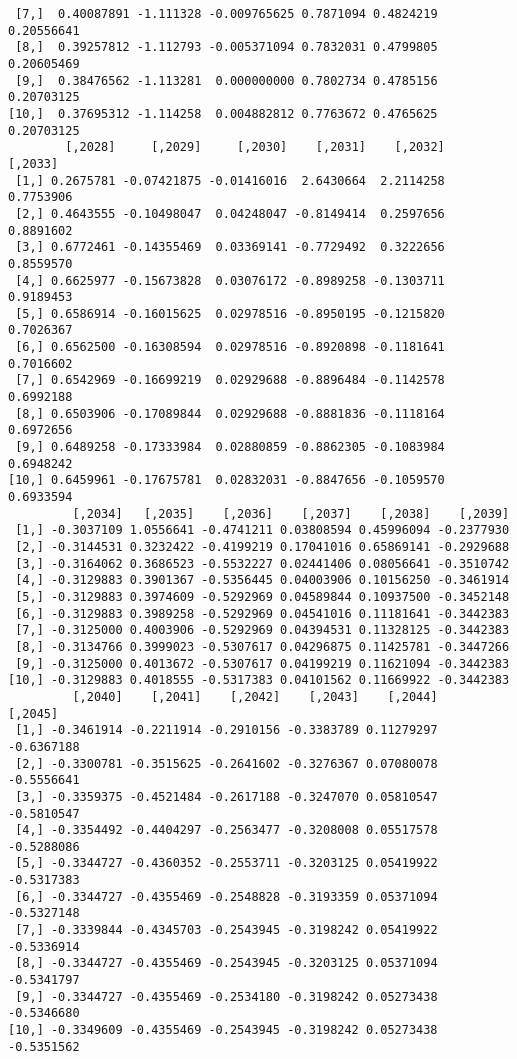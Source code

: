 \documentclass[
  letterpaper,
  DIV=11,
  numbers=noendperiod]{scrreprt}
\begin{document}
\begin{verbatim}
 [7,]  0.40087891 -1.111328 -0.009765625 0.7871094 0.4824219 0.20556641
 [8,]  0.39257812 -1.112793 -0.005371094 0.7832031 0.4799805 0.20605469
 [9,]  0.38476562 -1.113281  0.000000000 0.7802734 0.4785156 0.20703125
[10,]  0.37695312 -1.114258  0.004882812 0.7763672 0.4765625 0.20703125
        [,2028]     [,2029]     [,2030]    [,2031]    [,2032]   [,2033]
 [1,] 0.2675781 -0.07421875 -0.01416016  2.6430664  2.2114258 0.7753906
 [2,] 0.4643555 -0.10498047  0.04248047 -0.8149414  0.2597656 0.8891602
 [3,] 0.6772461 -0.14355469  0.03369141 -0.7729492  0.3222656 0.8559570
 [4,] 0.6625977 -0.15673828  0.03076172 -0.8989258 -0.1303711 0.9189453
 [5,] 0.6586914 -0.16015625  0.02978516 -0.8950195 -0.1215820 0.7026367
 [6,] 0.6562500 -0.16308594  0.02978516 -0.8920898 -0.1181641 0.7016602
 [7,] 0.6542969 -0.16699219  0.02929688 -0.8896484 -0.1142578 0.6992188
 [8,] 0.6503906 -0.17089844  0.02929688 -0.8881836 -0.1118164 0.6972656
 [9,] 0.6489258 -0.17333984  0.02880859 -0.8862305 -0.1083984 0.6948242
[10,] 0.6459961 -0.17675781  0.02832031 -0.8847656 -0.1059570 0.6933594
         [,2034]   [,2035]    [,2036]    [,2037]    [,2038]    [,2039]
 [1,] -0.3037109 1.0556641 -0.4741211 0.03808594 0.45996094 -0.2377930
 [2,] -0.3144531 0.3232422 -0.4199219 0.17041016 0.65869141 -0.2929688
 [3,] -0.3164062 0.3686523 -0.5532227 0.02441406 0.08056641 -0.3510742
 [4,] -0.3129883 0.3901367 -0.5356445 0.04003906 0.10156250 -0.3461914
 [5,] -0.3129883 0.3974609 -0.5292969 0.04589844 0.10937500 -0.3452148
 [6,] -0.3129883 0.3989258 -0.5292969 0.04541016 0.11181641 -0.3442383
 [7,] -0.3125000 0.4003906 -0.5292969 0.04394531 0.11328125 -0.3442383
 [8,] -0.3134766 0.3999023 -0.5307617 0.04296875 0.11425781 -0.3447266
 [9,] -0.3125000 0.4013672 -0.5307617 0.04199219 0.11621094 -0.3442383
[10,] -0.3129883 0.4018555 -0.5317383 0.04101562 0.11669922 -0.3442383
         [,2040]    [,2041]    [,2042]    [,2043]    [,2044]    [,2045]
 [1,] -0.3461914 -0.2211914 -0.2910156 -0.3383789 0.11279297 -0.6367188
 [2,] -0.3300781 -0.3515625 -0.2641602 -0.3276367 0.07080078 -0.5556641
 [3,] -0.3359375 -0.4521484 -0.2617188 -0.3247070 0.05810547 -0.5810547
 [4,] -0.3354492 -0.4404297 -0.2563477 -0.3208008 0.05517578 -0.5288086
 [5,] -0.3344727 -0.4360352 -0.2553711 -0.3203125 0.05419922 -0.5317383
 [6,] -0.3344727 -0.4355469 -0.2548828 -0.3193359 0.05371094 -0.5327148
 [7,] -0.3339844 -0.4345703 -0.2543945 -0.3198242 0.05419922 -0.5336914
 [8,] -0.3344727 -0.4355469 -0.2543945 -0.3203125 0.05371094 -0.5341797
 [9,] -0.3344727 -0.4355469 -0.2534180 -0.3198242 0.05273438 -0.5346680
[10,] -0.3349609 -0.4355469 -0.2543945 -0.3198242 0.05273438 -0.5351562

\end{verbatim}
\end{document}
